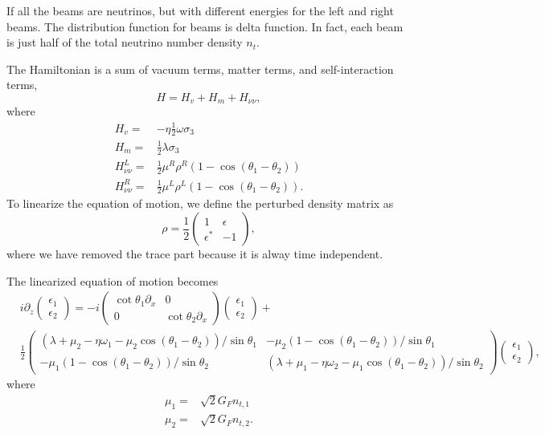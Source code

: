 If all the beams are neutrinos, but with different energies for the left and right beams. The distribution function for beams is delta function. In fact, each beam is just half of the total neutrino number density $n_t$.

The Hamiltonian is a sum of vacuum terms, matter terms, and self-interaction terms,
\begin{equation}
   H= H_v + H_m + H_{\nu\nu}, 
\end{equation}
where
\begin{align}
   H_v =& - \eta \frac{1}{2}\omega \sigma_3 \\
   H_m =& \frac{1}{2}\lambda \sigma_3\\
   H_{\nu\nu}^L =& \frac{1}{2}\mu^R \rho^R (1-\cos(\theta_1-\theta_2))\\
   H_{\nu\nu}^R =& \frac{1}{2}\mu^L \rho^L (1-\cos(\theta_1-\theta_2)).
\end{align}
To linearize the equation of motion, we define the perturbed density matrix as
\begin{equation}
   \rho = \frac{1}{2}\begin{pmatrix}
   1 & \epsilon\\
   \epsilon^* & -1
   \end{pmatrix},
\end{equation}
where we have removed the trace part because it is alway time independent.


The linearized equation of motion becomes
\small\begin{align}
   &i \partial_z \begin{pmatrix}
   \epsilon_1 \\
   \epsilon_2
   \end{pmatrix} =  - i \begin{pmatrix}\cot\theta_1\partial_x & 0 \\
   0 & \cot\theta_2 \partial_x
   \end{pmatrix} \begin{pmatrix}
   \epsilon_1 \\
   \epsilon_2
   \end{pmatrix} + \nonumber\\
   &
   \frac{1}{2}\begin{pmatrix}
   (\lambda+ \mu_2 - \eta \omega_1 - \mu_2 \cos(\theta_1-\theta_2) )/\sin \theta_1 & -\mu_2 (1-\cos(\theta_1-\theta_2)) /\sin \theta_1\\
   -\mu_1 (1- \cos(\theta_1-\theta_2))/\sin\theta_2 & (\lambda + \mu_1 - \eta \omega_2 - \mu_1 \cos(\theta_1-\theta_2) )/\sin\theta_2
   \end{pmatrix}\begin{pmatrix}
   \epsilon_1 \\
   \epsilon_2
   \end{pmatrix},
   \label{chap:dr-sec:two-beams-eqn:line-model-two-beams-all-neutrino-linearized-eom}
\end{align}\normalsize
where
\begin{align*}
   \mu_1 =& \sqrt{2}G_F n_{t,1}\\
   \mu_2 =& \sqrt{2}G_F n_{t,2}. 
\end{align*}
   


